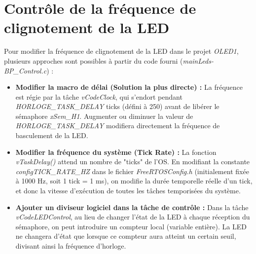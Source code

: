 \section{Contrôle de la fréquence de clignotement de la LED}

Pour modifier la fréquence de clignotement de la LED dans le projet \textit{OLED1}, plusieurs approches sont possibles à partir du code fourni (\textit{mainLeds-BP\_Control.c}) :

\begin{itemize}
    \item \textbf{Modifier la macro de délai (Solution la plus directe) :} La fréquence est régie par la tâche \textit{vCodeClock}, qui s'endort pendant \textit{HORLOGE\_TASK\_DELAY} ticks (défini à 250) avant de libérer le sémaphore \textit{xSem\_H1}. Augmenter ou diminuer la valeur de \textit{HORLOGE\_TASK\_DELAY} modifiera directement la fréquence de basculement de la LED. \\
    
    \item \textbf{Modifier la fréquence du système (Tick Rate) :} La fonction \textit{vTaskDelay()} attend un nombre de "ticks" de l'OS. En modifiant la constante \textit{configTICK\_RATE\_HZ} dans le fichier \textit{FreeRTOSConfig.h} (initialement fixée à 1000 Hz, soit 1 tick = 1 ms), on modifie la durée temporelle réelle d'un tick, et donc la vitesse d'exécution de toutes les tâches temporisées du système. \\
    
    \item \textbf{Ajouter un diviseur logiciel dans la tâche de contrôle :} Dans la tâche \textit{vCodeLEDControl}, au lieu de changer l'état de la LED à chaque réception du sémaphore, on peut introduire un compteur local (variable entière). La LED ne changera d'état que lorsque ce compteur aura atteint un certain seuil, divisant ainsi la fréquence d'horloge.
\end{itemize}